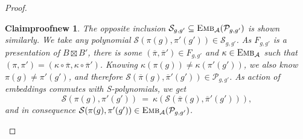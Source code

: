 \documentclass[10pt,a4paper]{amsart}
\newtheorem{claimproofnew}{Claimproofnew}
\newcommand{\E}{{\embed{\WW}}}
\newcommand{\Pres}[1]{\mathcal{P}_{#1}}
\newcommand{\Sof}[1]{\mathcal{S}(#1)}
\newcommand{\Ssub}[1]{\mathcal{S}_{#1}}
\newcommand{\Vs}{B}
\newcommand{\WW}{\mathcal{A}}
\newcommand{\embed}[1]{\text{\sc Emb}_{#1}}
\newcommand{\embsetprod}[2]{#1\boxtimes #2}
\begin{document}
\begin{proof}
\begin{claimproofnew}
The opposite inclusion $\Ssub {g,g'} \subseteq \E(\Pres{g,g'})$ is shown similarly.
We take any polynomial $\Sof {\pi(g), \pi'(g')} \in \Ssub {g,g'}$.
As $F_{g,g'}$ is a presentation of $\embsetprod \Vs{\Vs'}$, there is some 
$(\overline\pi, \overline\pi')\in F_{g,g'}$ and
$\kappa\in\E$ such that
$(\pi,\pi') = (\kappa\circ\overline\pi, \kappa\circ\overline\pi')$.
Knowing $\kappa(\pi(g))\neq\kappa(\pi'(g'))$, we also know $\pi(g)\neq\pi'(g')$,
and therefore $\Sof {\overline\pi(g), \overline\pi'(g')} \in \Pres{g,g'}$.
As action of embeddings commutes with S-polynomials, we get
\[
\Sof {\pi(g), \pi'(g')} \ = \ 
\kappa(\Sof {\overline\pi(g), \overline\pi'(g')}),
\]
and in consequence $\Sof {\pi(g), \pi'(g')}\in\E(\Pres{g,g'})$.
\end{claimproofnew}



\end{proof}
\end{document}

